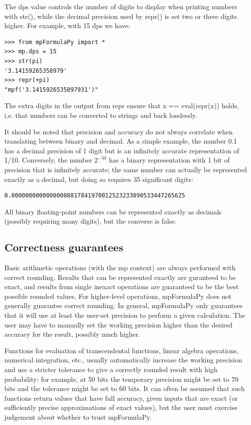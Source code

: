 \vpara
The dps value controls the number of digits to display when printing numbers with str(),
while the decimal precision used by repr() is set two or three digits higher. For example,
with 15 dps we have:

\begin{lstlisting}
>>> from mpFormulaPy import *
>>> mp.dps = 15
>>> str(pi)
'3.14159265358979'
>>> repr(+pi)
"mpf('3.1415926535897931')"
\end{lstlisting}


The extra digits in the output from repr ensure that x == eval(repr(x)) holds, i.e. that numbers can be converted to strings and back losslessly.

\vpara
It should be noted that precision and accuracy do not always correlate when translating between binary and decimal. As a simple example, the number 0.1 has a decimal precision of 1 digit but is an infinitely accurate representation of 1/10. Conversely, the number $2^{-50}$ has a binary representation with 1 bit of precision that is infinitely accurate; the same number can actually be represented exactly as a decimal, but doing so requires 35 significant digits:

\begin{lstlisting}
0.00000000000000088817841970012523233890533447265625
\end{lstlisting}


All binary floating-point numbers can be represented exactly as decimals (possibly requiring many digits), but the converse is false.




\subsection{Correctness guarantees}

Basic arithmetic operations (with the mp context) are always performed with correct rounding. Results that can be represented exactly are guranteed to be exact, and results from single inexact operations are guaranteed to be the best possible rounded values. For higher-level
operations, mpFormulaPy does not generally guarantee correct rounding. In general, mpFormulaPy only guarantees that it will use at least the user-set precision to perform a given calculation. The user may have to manually set the working precision higher than the desired accuracy for the result, possibly much higher.

\vpara
Functions for evaluation of transcendental functions, linear algebra operations, numerical integration, etc., usually automatically increase the working precision and use a stricter tolerance to give a correctly rounded result with high probability: for example, at 50 bits the
temporary precision might be set to 70 bits and the tolerance might be set to 60 bits. It can often be assumed that such functions return values that have full accuracy, given inputs that are exact (or sufficiently precise approximations of exact values), but the user must exercise judgement about whether to trust mpFormulaPy.

